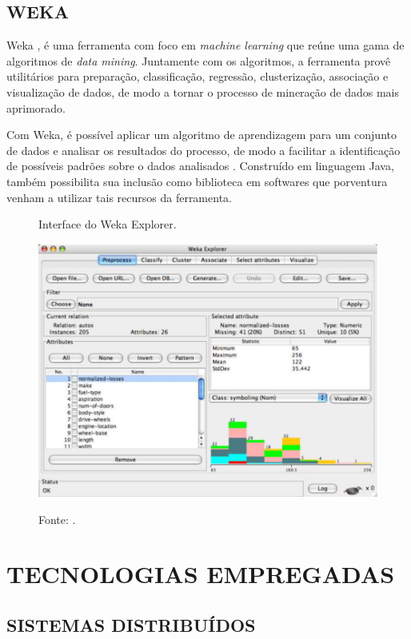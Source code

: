 \subsection{WEKA}

Weka \cite{hall2009weka}, é uma ferramenta com foco em \textit{machine learning} que reúne uma gama de algoritmos de \textit{data mining}. Juntamente com os algoritmos, a ferramenta provê utilitários para preparação, classificação, regressão, clusterização, associação e visualização de dados, de modo a tornar o processo de mineração de dados mais aprimorado.

Com Weka, é possível aplicar um algoritmo de aprendizagem para um conjunto de dados e analisar os resultados do processo, de modo a facilitar a identificação de possíveis padrões sobre o dados analisados \cite{eibe2016weka}. Construído em linguagem Java, também possibilita sua inclusão como biblioteca em softwares que porventura venham a utilizar tais recursos da ferramenta. 

\begin{figure}[H]
	\caption{Interface do Weka Explorer.}
	\centering %
	\includegraphics[width=13cm]{resources/weka.png} %
	\label{figura:weka_explorer}
	\caption*{Fonte: .}
\end{figure}

\section{TECNOLOGIAS EMPREGADAS}

\subsection{SISTEMAS DISTRIBUÍDOS}

